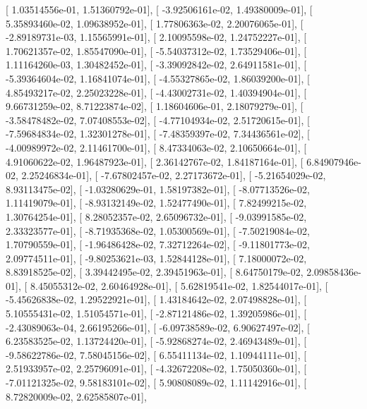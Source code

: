 \documentclass{article}
\begin{document}
       [  1.03514556e-01,   1.51360792e-01],
       [ -3.92506161e-02,   1.49380009e-01],
       [  5.35893460e-02,   1.09638952e-01],
       [  1.77806363e-02,   2.20076065e-01],
       [ -2.89189731e-03,   1.15565991e-01],
       [  2.10095598e-02,   1.24752227e-01],
       [  1.70621357e-02,   1.85547090e-01],
       [ -5.54037312e-02,   1.73529406e-01],
       [  1.11164260e-03,   1.30482452e-01],
       [ -3.39092842e-02,   2.64911581e-01],
       [ -5.39364604e-02,   1.16841074e-01],
       [ -4.55327865e-02,   1.86039200e-01],
       [  4.85493217e-02,   2.25023228e-01],
       [ -4.43002731e-02,   1.40394904e-01],
       [  9.66731259e-02,   8.71223874e-02],
       [  1.18604606e-01,   2.18079279e-01],
       [ -3.58478482e-02,   7.07408553e-02],
       [ -4.77104934e-02,   2.51720615e-01],
       [ -7.59684834e-02,   1.32301278e-01],
       [ -7.48359397e-02,   7.34436561e-02],
       [ -4.00989972e-02,   2.11461700e-01],
       [  8.47334063e-02,   2.10650664e-01],
       [  4.91060622e-02,   1.96487923e-01],
       [  2.36142767e-02,   1.84187164e-01],
       [  6.84907946e-02,   2.25246834e-01],
       [ -7.67802457e-02,   2.27173672e-01],
       [ -5.21654029e-02,   8.93113475e-02],
       [ -1.03280629e-01,   1.58197382e-01],
       [ -8.07713526e-02,   1.11419079e-01],
       [ -8.93132149e-02,   1.52477490e-01],
       [  7.82499215e-02,   1.30764254e-01],
       [  8.28052357e-02,   2.65096732e-01],
       [ -9.03991585e-02,   2.33323577e-01],
       [ -8.71935368e-02,   1.05300569e-01],
       [ -7.50219084e-02,   1.70790559e-01],
       [ -1.96486428e-02,   7.32712264e-02],
       [ -9.11801773e-02,   2.09774511e-01],
       [ -9.80253621e-03,   1.52844128e-01],
       [  7.18000072e-02,   8.83918525e-02],
       [  3.39442495e-02,   2.39451963e-01],
       [  8.64750179e-02,   2.09858436e-01],
       [  8.45055312e-02,   2.60464928e-01],
       [  5.62819541e-02,   1.82544017e-01],
       [ -5.45626838e-02,   1.29522921e-01],
       [  1.43184642e-02,   2.07498828e-01],
       [  5.10555431e-02,   1.51054571e-01],
       [ -2.87121486e-02,   1.39205986e-01],
       [ -2.43089063e-04,   2.66195266e-01],
       [ -6.09738589e-02,   6.90627497e-02],
       [  6.23583525e-02,   1.13724420e-01],
       [ -5.92868274e-02,   2.46943489e-01],
       [ -9.58622786e-02,   7.58045156e-02],
       [  6.55411134e-02,   1.10944111e-01],
       [  2.51933957e-02,   2.25796091e-01],
       [ -4.32672208e-02,   1.75050360e-01],
       [ -7.01121325e-02,   9.58183101e-02],
       [  5.90808089e-02,   1.11142916e-01],
       [  8.72820009e-02,   2.62585807e-01],
\end{document}
